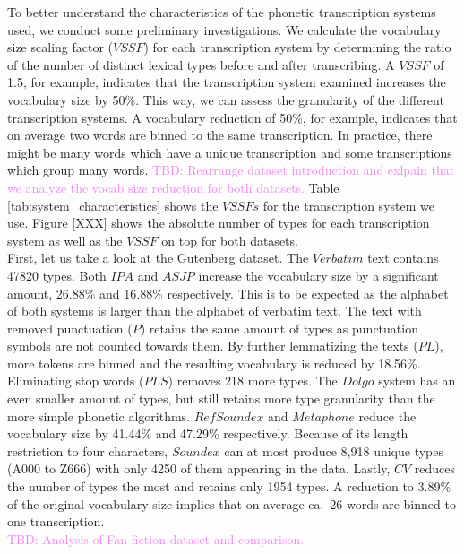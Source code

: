 To better understand the characteristics of the phonetic transcription systems used, we conduct some preliminary investigations.
We calculate the vocabulary size scaling factor ($VSSF$) for each transcription system by determining the ratio of the number of distinct lexical types before and after transcribing.
A $VSSF$ of 1.5, for example, indicates that the transcription system examined increases the vocabulary size by 50\%.
This way, we can assess the granularity of the different transcription systems.
A vocabulary reduction of 50\%, for example, indicates that on average two words are binned to the same transcription.
In practice, there might be many words which have a unique transcription and some transcriptions which group many words.
\textcolor{violet}{TBD: Rearrange dataset introduction and exlpain that we analyze the vocab size reduction for both datasets.}
Table \ref{tab:system_characteristics} shows the $VSSFs$ for the transcription system we use.
Figure \ref{XXX} shows the absolute number of types for each transcription system as well as the $VSSF$ on top for both datasets.\\
First, let us take a look at the Gutenberg dataset.
The $Verbatim$ text contains 47820 types.
Both $IPA$ and $ASJP$ increase the vocabulary size by a significant amount, 26.88\% and 16.88\% respectively.
This is to be expected as the alphabet of both systems is larger than the alphabet of verbatim text.
The text with removed punctuation ($P$) retains the same amount of types as punctuation symbols are not counted towards them.
By further lemmatizing the texts ($PL$), more tokens are binned and the resulting vocabulary is reduced by 18.56\%.
Eliminating stop words ($PLS$) removes 218 more types.
The $Dolgo$ system has an even smaller amount of types, but still retains more type granularity than the more simple phonetic algorithms.
$RefSoundex$ and $Metaphone$ reduce the vocabulary size by 41.44\% and 47.29\% respectively.
Because of its length restriction to four characters, $Soundex$ can at most produce 8,918 unique types (A000 to Z666) with only 4250 of them appearing in the data.
Lastly, $CV$ reduces the number of types the most and retains only 1954 types.
A reduction to 3.89\% of the original vocabulary size implies that on average ca.\ 26 words are binned to one transcription.\\
\textcolor{violet}{TBD: Analysis of Fan-fiction dataset and comparison.}


